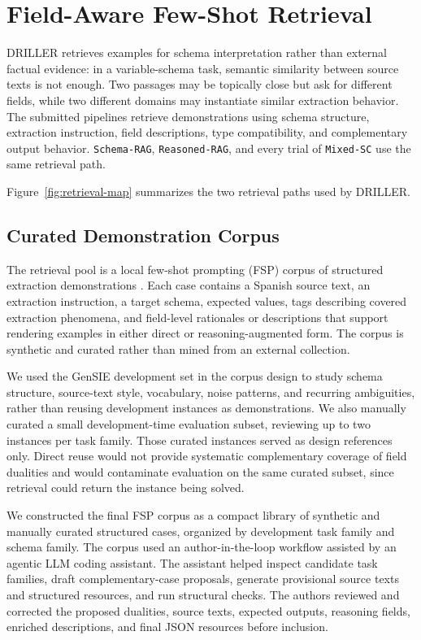 \section{Field-Aware Few-Shot Retrieval}

DRILLER retrieves examples for schema interpretation rather than external factual evidence: in a variable-schema task, semantic similarity between source texts is not enough. Two passages may be topically close but ask for different fields, while two different domains may instantiate similar extraction behavior. The submitted pipelines retrieve demonstrations using schema structure, extraction instruction, field descriptions, type compatibility, and complementary output behavior. \texttt{Schema-RAG}, \texttt{Reasoned-RAG}, and every trial of \texttt{Mixed-SC} use the same retrieval path.

Figure~\ref{fig:retrieval-map} summarizes the two retrieval paths used by DRILLER.



\FloatBarrier

\subsection{Curated Demonstration Corpus}

The retrieval pool is a local few-shot prompting (FSP) corpus of structured extraction demonstrations \cite{brown2020language}. Each case contains a Spanish source text, an extraction instruction, a target schema, expected values, tags describing covered extraction phenomena, and field-level rationales or descriptions that support rendering examples in either direct or reasoning-augmented form. The corpus is synthetic and curated rather than mined from an external collection.

We used the GenSIE development set in the corpus design to study schema structure, source-text style, vocabulary, noise patterns, and recurring ambiguities, rather than reusing development instances as demonstrations. We also manually curated a small development-time evaluation subset, reviewing up to two instances per task family. Those curated instances served as design references only. Direct reuse would not provide systematic complementary coverage of field dualities and would contaminate evaluation on the same curated subset, since retrieval could return the instance being solved.

We constructed the final FSP corpus as a compact library of synthetic and manually curated structured cases, organized by development task family and schema family. The corpus used an author-in-the-loop workflow assisted by an agentic LLM coding assistant. The assistant helped inspect candidate task families, draft complementary-case proposals, generate provisional source texts and structured resources, and run structural checks. The authors reviewed and corrected the proposed dualities, source texts, expected outputs, reasoning fields, enriched descriptions, and final JSON resources before inclusion.

